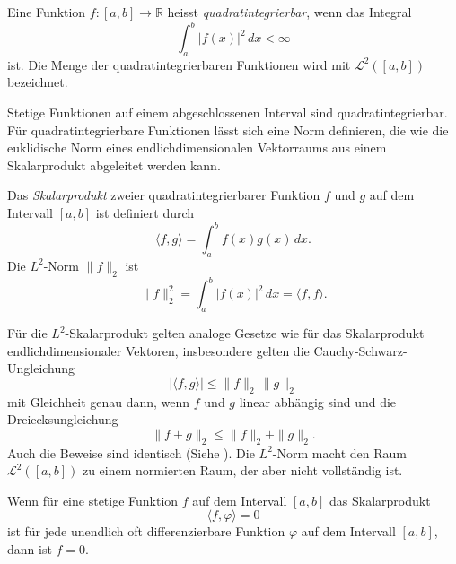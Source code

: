 \begin{definition}
%
Eine Funktion $f\colon[a,b]\to\mathbb{R}$ heisst {\em quadratintegrierbar},
wenn das Integral
\[
\int_a^b |f(x)|^2\,dx
<
\infty
\]
ist.
Die Menge der quadratintegrierbaren Funktionen wird mit
$\mathscr{L}^2([a,b])$ bezeichnet.
\end{definition}

Stetige Funktionen auf einem abgeschlossenen Interval sind
quadratintegrierbar.
Für quadratintegrierbare Funktionen lässt sich eine Norm definieren, die wie
die euklidische Norm eines endlichdimensionalen Vektorraums aus einem
Skalarprodukt abgeleitet werden kann.

\begin{definition}
Das {\em Skalarprodukt} zweier quadratintegrierbarer Funktion $f$ und $g$
%
%
auf dem Intervall $[a,b]$ ist definiert durch
\[
\langle f,g\rangle
=
\int_a^b f(x)g(x)\,dx.
\]
Die $L^2$-Norm $\| f\|_2$ ist
\[
\|f\|_2^2
=
\int_a^b |f(x)|^2\,dx
=
\langle f,f\rangle.
\]
\end{definition}

Für die $L^2$-Skalarprodukt gelten analoge Gesetze wie für das
Skalarprodukt endlichdimensionaler Vektoren, insbesondere gelten
die Cauchy-Schwarz-Ungleichung
\[
|\langle f,g\rangle| \le \|f\|_2\,\|g\|_2
\]
mit Gleichheit genau dann, wenn $f$ und $g$  linear abhängig sind
und die Dreiecksungleichung
\[
\|f+g\|_2 \le \|f\|_2 + \|g\|_2.
\]
Auch die Beweise sind identisch (Siehe \cite{buch:linalg}).
Die $L^2$-Norm macht den Raum $\mathscr{L}^2([a,b])$ zu einem
normierten Raum, der aber nicht vollständig ist.

\begin{satz}
Wenn für eine stetige Funktion $f$ auf dem Intervall $[a,b]$
das Skalarprodukt
\[
\langle f,\varphi\rangle = 0
\]
ist für jede unendlich oft differenzierbare Funktion $\varphi$ auf dem
Intervall $[a,b]$, dann ist $f=0$.
\end{satz}


